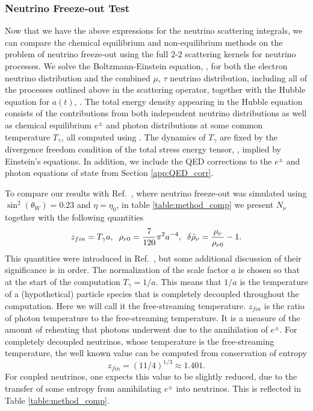 
\subsubsection{ Neutrino Freeze-out Test}
Now that we have the above expressions for the neutrino scattering integrals, we can compare the chemical equilibrium and non-equilibrium methods on the problem of neutrino freeze-out using the full $2$-$2$ scattering kernels for neutrino processes.  We solve the Boltzmann-Einstein equation, , for both the electron neutrino distribution and the combined $\mu$, $\tau$ neutrino distribution, including all of the  processes outlined above in the scattering operator, together with the Hubble equation for $a(t)$, .  The total energy density  appearing in the Hubble equation consists of the contributions from both independent neutrino distributions as well as chemical equilibrium $e^\pm$ and photon distributions at some common temperature $T_\gamma$, all computed using .  The dynamics of $T_\gamma$ are fixed by the divergence freedom condition of the total stress energy tensor, , implied by Einstein's equations.  In addition, we include the QED corrections to the $e^\pm$ and photon equations of state from Section \ref{app:QED_corr}.



To compare our results with Ref.~\cite{Mangano2005}, where neutrino freeze-out was simulated using $\sin^2(\theta_W)=0.23$ and $\eta=\eta_0$, in table \ref{table:method_comp} we present $N_\nu$ together with the following quantities
\begin{align}
 z_{fin}=T_\gamma a,\hspace{2mm}  \rho_{\nu 0}=\frac{7}{120}\pi^2a^{-4}, \hspace{2mm}  \delta\bar\rho_{\nu}= \frac{\rho_\nu}{\rho_{\nu 0}}-1.
\end{align}
This quantities were introduced in Ref.~\cite{Mangano2005}, but some additional discussion of their significance is in order.  The normalization of the scale factor $a$ is chosen so that at the start of the computation $T_\gamma=1/a$.  This means that $1/a$ is the temperature of a (hypothetical) particle species that is completely decoupled throughout the computation.  Here we will call it the free-streaming temperature.   $z_{fin}$ is the ratio of photon temperature to the free-streaming temperature.  It is a measure of the amount of reheating that photons underwent due to the annihilation of $e^\pm$.  For completely decoupled neutrinos, whose temperature is the free-streaming temperature, the well known value can be computed from conservation of entropy
\begin{equation}
z_{fin}=(11/4)^{1/3}\approx 1.401.
\end{equation}
For coupled neutrinos, one expects this value to be slightly reduced, due to the  transfer of some entropy from annihilating $e^\pm$ into neutrinos. This is reflected in Table \ref{table:method_comp}.

